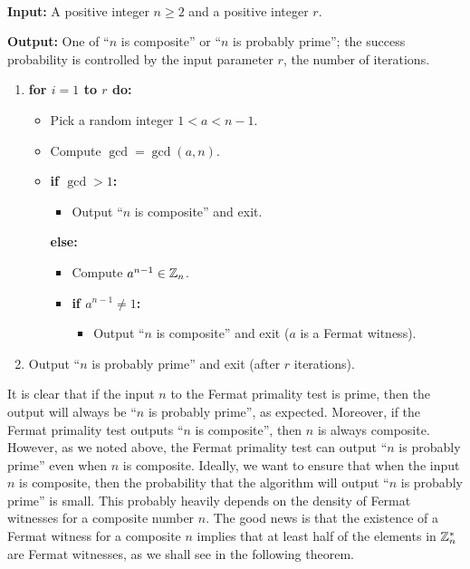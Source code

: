 \begin{algo}~

{\bf Input:} A positive integer $n \geq 2$ and a positive integer $r$. 

{\bf Output:} One of ``$n$ is composite'' or ``$n$ is probably prime''; the 
success probability is controlled by the input parameter $r$, the number of 
iterations. 
\begin{enumerate}
    \item {\bf for $i = 1$ to $r$ do:}
    \begin{itemize}
        \item Pick a random integer $1 < a < n-1$. 
        \item Compute $\gcd = \gcd(a, n)$. 
        \item {\bf if $\gcd > 1$:}
        \begin{itemize}[$\circ$]
            \item Output ``$n$ is composite'' and exit.
        \end{itemize}
        {\bf else:}
        \begin{itemize}[$\circ$]
            \item Compute $a^{n-1} \in \mathbb{Z}_n$. 
            \item {\bf if $a^{n-1} \neq 1$:}
            \begin{itemize}[--]
                \item Output ``$n$ is composite'' and exit ($a$ is a Fermat witness).
            \end{itemize}
        \end{itemize}
    \end{itemize}
    \item Output ``$n$ is probably prime'' and exit (after $r$ iterations).
\end{enumerate}
\end{algo}

It is clear that if the input $n$ to the Fermat primality test is prime, then the output 
will always be ``$n$ is probably prime'', as expected. Moreover, if the Fermat primality test 
outputs ``$n$ is composite'', then $n$ is always composite. However, as we noted above, the Fermat 
primality test can output ``$n$ is probably prime'' even when $n$ is composite. Ideally, we want 
to ensure that when the input $n$ is composite, then the probability that the algorithm will 
output ``$n$ is probably prime'' is small. This probably heavily depends on the density of Fermat 
witnesses for a composite number $n$. The good news is that the existence of a Fermat witness for a 
composite $n$ implies that at least half of the elements in $\mathbb{Z}_n^*$ are Fermat witnesses, as we 
shall see in the following theorem.

